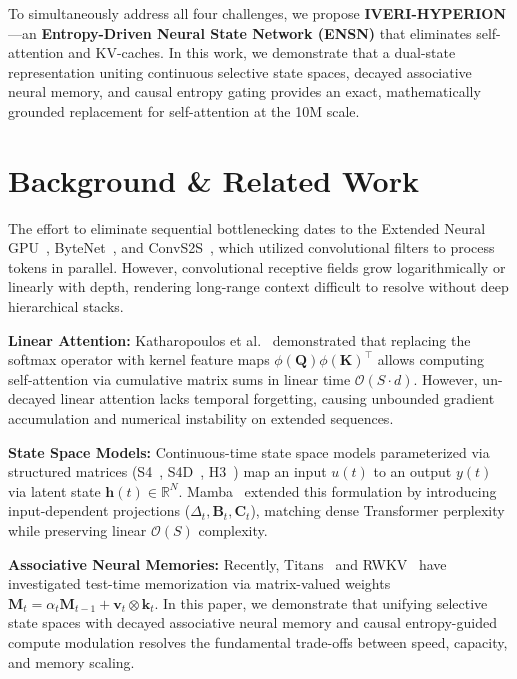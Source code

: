 \documentclass[10pt,twocolumn,letterpaper]{article}
\begin{document}
To simultaneously address all four challenges, we propose \textbf{IVERI-HYPERION}—an \textbf{Entropy-Driven Neural State Network (ENSN)} that eliminates self-attention and KV-caches. In this work, we demonstrate that a dual-state representation uniting continuous selective state spaces, decayed associative neural memory, and causal entropy gating provides an exact, mathematically grounded replacement for self-attention at the 10M scale.

\section{Background \& Related Work}
\label{sec:background}

The effort to eliminate sequential bottlenecking dates to the Extended Neural GPU~\cite{kaiser2016neuralgpu}, ByteNet~\cite{kalchbrenner2016bytenet}, and ConvS2S~\cite{gehring2017convs2s}, which utilized convolutional filters to process tokens in parallel. However, convolutional receptive fields grow logarithmically or linearly with depth, rendering long-range context difficult to resolve without deep hierarchical stacks.

\textbf{Linear Attention:} Katharopoulos et al.~\cite{katharopoulos2020transformers} demonstrated that replacing the softmax operator with kernel feature maps $\phi(\mathbf{Q})\phi(\mathbf{K})^\top$ allows computing self-attention via cumulative matrix sums in linear time $\mathcal{O}(S \cdot d)$. However, un-decayed linear attention lacks temporal forgetting, causing unbounded gradient accumulation and numerical instability on extended sequences.

\textbf{State Space Models:} Continuous-time state space models parameterized via structured matrices (S4~\cite{gu2021s4}, S4D~\cite{gu2022s4d}, H3~\cite{fu2023h3}) map an input $u(t)$ to an output $y(t)$ via latent state $\mathbf{h}(t) \in \mathbb{R}^N$. Mamba~\cite{gu2023mamba} extended this formulation by introducing input-dependent projections ($\Delta_t, \mathbf{B}_t, \mathbf{C}_t$), matching dense Transformer perplexity while preserving linear $\mathcal{O}(S)$ complexity.

\textbf{Associative Neural Memories:} Recently, Titans~\cite{behrouz2024titans} and RWKV~\cite{peng2023rwkv} have investigated test-time memorization via matrix-valued weights $\mathbf{M}_t = \alpha_t \mathbf{M}_{t-1} + \mathbf{v}_t \otimes \mathbf{k}_t$. In this paper, we demonstrate that unifying selective state spaces with decayed associative neural memory and causal entropy-guided compute modulation resolves the fundamental trade-offs between speed, capacity, and memory scaling.
\end{document}
